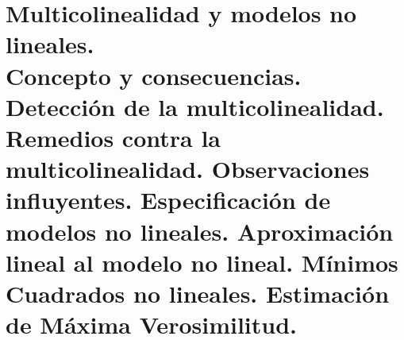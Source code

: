 
\chapter[Multicolinealidad y modelos no lineales.]{Multicolinealidad y modelos no lineales. \\
\normalsize  Concepto y consecuencias. Detecci\'on de la multicolinealidad. Remedios contra la multicolinealidad. Observaciones influyentes. Especificaci\'on de modelos no lineales. Aproximaci\'on lineal al modelo no lineal. M\'inimos Cuadrados no lineales. Estimaci\'on de M\'axima Verosimilitud.}




